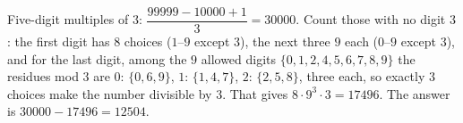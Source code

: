 Five-digit multiples of $3$: $\dfrac{99999-10000+1}{3}=30000$. Count those with no digit $3$: the first digit has $8$ choices ($1$--$9$ except $3$), the next three $9$ each ($0$--$9$ except $3$), and for the last digit, among the $9$ allowed digits $\{0,1,2,4,5,6,7,8,9\}$ the residues mod $3$ are $0$: $\{0,6,9\}$, $1$: $\{1,4,7\}$, $2$: $\{2,5,8\}$, three each, so exactly $3$ choices make the number divisible by $3$. That gives $8\cdot9^3\cdot3=17496$. The answer is $30000-17496=\boxed{12504}$.
